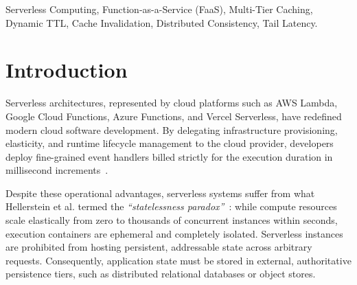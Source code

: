 \documentclass[conference]{IEEEtran}
\begin{document}
\begin{abstract}
Our empirical findings demonstrate that two-tier hierarchical caching ($E_4$) achieves a $2.36\times$ end-to-end client latency speedup and reduces median latency ($p50$) from $3,250.79\text{ ms}$ to $479.21\text{ ms}$ by resolving $73.9\%$ of read requests directly from cache tiers ($48.6\%$ in $L_1$ RAM, $25.4\%$ in $L_2$ Redis). Internally, local memory hits execute in $0.05\text{ ms}$, an acceleration of $>3,800\times$ over authoritative database reads ($691\text{ ms}$). Furthermore, we show that adaptive admission eliminates cache pollution by filtering transient ``one-hit wonders,'' while dynamic TTL expands entry retention proportionally to request frequency. Finally, we characterize the fundamental trade-off between read acceleration and write/delete consistency: maintaining strict cross-instance freshness via synchronized version tombstones ($E_6$) eliminates $99.9\%$ of stale reads but imposes a $17.8\%$ latency penalty on mutating operations ($3,708\text{ ms}$ vs. $3,130\text{ ms}$). We map the multi-objective Pareto efficiency frontier, proving that hierarchical hybrid caching represents the globally optimal design for latency-critical serverless microservices.
\end{abstract}

\begin{IEEEkeywords}
Serverless Computing, Function-as-a-Service (FaaS), Multi-Tier Caching, Dynamic TTL, Cache Invalidation, Distributed Consistency, Tail Latency.
\end{IEEEkeywords}

\section{Introduction}
Serverless architectures, represented by cloud platforms such as AWS Lambda, Google Cloud Functions, Azure Functions, and Vercel Serverless, have redefined modern cloud software development. By delegating infrastructure provisioning, elasticity, and runtime lifecycle management to the cloud provider, developers deploy fine-grained event handlers billed strictly for the execution duration in millisecond increments~\cite{zaharia2021}. 

Despite these operational advantages, serverless systems suffer from what Hellerstein et al. termed the \textit{``statelessness paradox''}~\cite{hellerstein2019}: while compute resources scale elastically from zero to thousands of concurrent instances within seconds, execution containers are ephemeral and completely isolated. Serverless instances are prohibited from hosting persistent, addressable state across arbitrary requests. Consequently, application state must be stored in external, authoritative persistence tiers, such as distributed relational databases or object stores.
\end{document}
